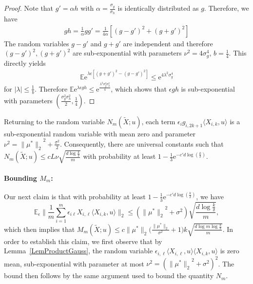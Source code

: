 \documentclass[twoside,11pt]{article}
\def\EE{ \mathbb{E} }
\def\E{ \mathrm{e} }							%
\newcommand{\norm}[1]{\ensuremath{\|#1\|_2}}
\newcommand{\paramobs}{\mu}
\newcommand{\trueparamobs}{\ensuremath{\paramobs^*}}
\newcommand{\kdim}{\ensuremath{k}}
\newcommand{\Xtil}{\ensuremath{\widetilde{X}}}
\newcommand{\lipcont}{\ensuremath{L}}
\newcommand{\processradM}{\ensuremath{M_m}}
\newcommand{\processradN}{\ensuremath{N_m}}
\begin{document}
\begin{proof}
Note that $g' = \alpha h$ with $\alpha = \frac{\sigma_g}{\sigma_h}$ is
identically distributed as $g$. Therefore, we have
\begin{align*}
g h = \frac{1}{\alpha} g g' = \frac{1}{4 \alpha}[(g-g')^2+ (g+g')^2]
\end{align*}
The random variables $g-g'$ and $g+g'$ are independent and therefore
$(g-g')^2, (g+g')^2$ are sub-exponential with parameters $\nu^2 =
4\sigma_g^4$, $b=\frac{1}{4}$. This directly yields
\begin{align*}
\EE \E^{\lambda \epsilon [(g+g')^2 - (g-g')^2]} \leq \E^{4 \lambda^2 \sigma_g^4} 
\end{align*}
for $|\lambda|\leq \frac{1}{b}$. Therefore $\EE \E^{\lambda \epsilon
  gh} \leq \E^{\frac{\lambda^2 \sigma_g^2 \sigma_h^2}{4}}$, which
shows that $\epsilon g h$ is sub-exponential with parameters
$(\frac{\sigma_g^2\sigma_h^2}{2}, \frac{1}{4})$.
\end{proof}
%

Returning to the random variable $\processradN(\Xtil;u)$, each term
$\epsilon_i g_{i,2k+1} \langle X_{i,k},u\rangle$ is a sub-exponential
random variable with mean zero and parameter $\nu^2 =
\norm{\trueparamobs}^2 + \frac{\sigma^2}{2}$.  Consequently, there are
universal constants such that $\processradN(\Xtil;u) \leq c
\lipcont\nu\sqrt{\frac{d \log \frac{\kdim}{\delta}}{m}}$ with probability
at least $1- \frac{1}{3}\E^{-c'd \log(\frac{\kdim}{\delta})}$.


\paragraph{Bounding $\processradM$:}
Our next claim is that with probability at least
$1-\frac{1}{3}\E^{-c'd \log(\frac{\kdim}{\delta})}$, we
have
\begin{equation}
\label{EqnTerm4}
\EE_{\epsilon} \norm{\frac{1}{m}\sum_{i=1}^m \epsilon_{i\ell}
  X_{i,\ell} \langle X_{i,k},u\rangle} \leq (\norm{\trueparamobs}^2 +
\sigma^2)\sqrt{\frac{ d \log \frac{k}{\delta}}{m}},
\end{equation}
which then implies that $\processradM(\Xtil;u) \leq c
\norm{\trueparamobs}\big(\frac{\norm{\trueparamobs}}{\sigma^2}+1\big)
k \sqrt{\frac{ d \log m \log \frac{k}{\delta}}{m}}$.  In order to
establish this claim, we first observe that by
Lemma~\ref{LemProductGauss}, the random variable $\epsilon_{i,\ell}
\langle X_{i,\ell}, u\rangle\langle X_{i,k}, u\rangle$ is zero mean,
sub-exponential with parameter at most $\nu^2 =
(\norm{\trueparamobs}^2 + \sigma^2)^2$.  The bound then follows by the
same argument used to bound the quantity $\processradN$.
\end{document}
